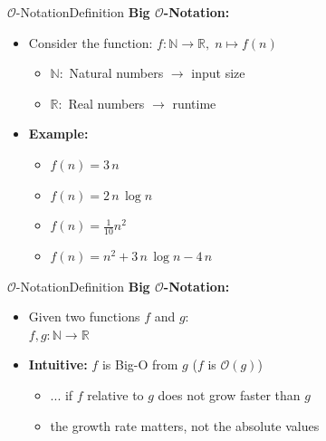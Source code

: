 \begin{frame}{$\mathcal{O}$-Notation}{Definition}
  \textbf{Big $\mathcal{O}$-Notation:}
  \begin{itemize}
    \item
     Consider the function:
      $f\!: \mathbb{N} \to \mathbb{R}, \; n \mapsto f(n)$
      \begin{itemize}
        \item
          $\mathbb{N}\!:$ Natural numbers $\rightarrow$ input size
        \item
          $\mathbb{R}\!:$ Real numbers $\rightarrow$ runtime
      \end{itemize}
   \item
     \textbf{Example:}
   \begin{itemize}
     \item
       $f(n) = 3 \, n$
     \item
       $f(n) = 2 \, n \, \log n$
     \item
       $f(n) = \frac{1}{10} n^2$
     \item
       $f(n) = n^2 + 3 \, n \, \log n - 4 \, n$
    \end{itemize}
  \end{itemize}
\end{frame}


\begin{frame}{$\mathcal{O}$-Notation}{Definition}
  \textbf{Big $\mathcal{O}$-Notation:}
  \begin{itemize}
    \item
      Given two functions $f$ and $g$: \\
      $f,g\!: \mathbb{N} \to \mathbb{R}$
    \item
      \textbf{Intuitive:} $f$ is Big-O from $g$ ($f$ is $\mathcal{O}(g)$)\\
         \begin{itemize}
            \item
            ... if $f$ relative to $g$ does not grow faster than $g$
            \item
                the growth rate matters, not the absolute values
        \end{itemize}
  \end{itemize}
\end{frame}



